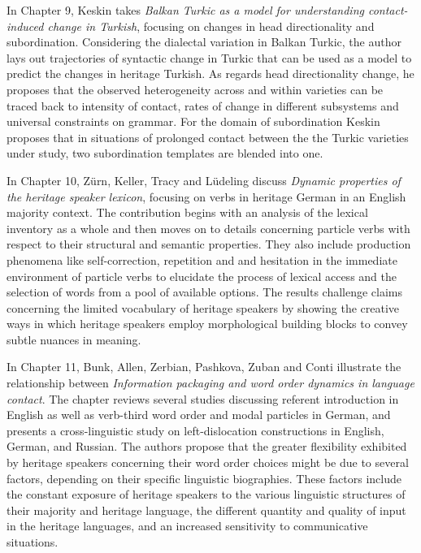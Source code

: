 \documentclass[output=paper,colorlinks,citecolor=brown]{langscibook}
\begin{document}
In Chapter 9, Keskin takes \textit{Balkan Turkic as a model for understanding contact-induced change in Turkish}, focusing on changes in head directionality and subordination. Considering the dialectal variation in Balkan Turkic, the author lays out trajectories of syntactic change in Turkic that can be used as a model to predict the changes in heritage Turkish. As regards head directionality change, he proposes that the observed heterogeneity across and within varieties can be traced back to intensity of contact, rates of change in different subsystems and universal constraints on grammar. For the domain of subordination Keskin proposes that in situations of prolonged contact between the the Turkic varieties under study, two subordination templates are blended into one.

In Chapter 10, Zürn, Keller, Tracy and Lüdeling discuss \textit{Dynamic properties of the heritage speaker lexicon}, focusing on verbs in heritage German in an English majority context. The contribution begins with an analysis of the lexical inventory as a whole and then moves on to details concerning particle verbs with respect to their structural and semantic properties. They also include production phenomena like self-correction, repetition and and hesitation in the immediate environment of particle verbs to elucidate the process of lexical access and the selection of words from a pool of available options. The results challenge claims concerning the limited vocabulary of heritage speakers by showing the creative ways in which heritage speakers employ morphological building blocks to convey subtle nuances in meaning.

In Chapter 11, Bunk, Allen, Zerbian, Pashkova, Zuban and Conti illustrate the relationship between \textit{Information packaging and word order dynamics in language contact}. The chapter reviews several studies discussing referent introduction in English as well as verb-third word order and modal particles in German, and presents a cross-linguistic study on left\hyp dislocation constructions in English, German, and Russian. The authors propose that the greater flexibility exhibited by heritage speakers concerning their word order choices might be due to several factors, depending on their specific linguistic biographies. These factors include the constant exposure of heritage speakers to the various linguistic structures of their majority and heritage language, the different quantity and quality of input in the heritage languages, and an increased sensitivity to communicative situations. 
\end{document}
